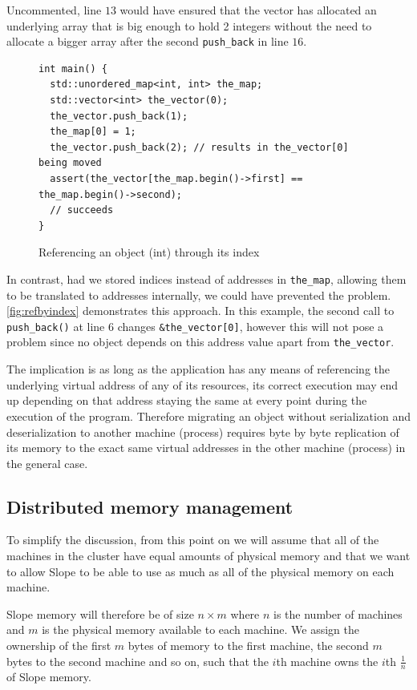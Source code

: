 Uncommented, line $13$ would have ensured that the vector has
    allocated an underlying array that is big enough to hold 2 integers without
    the need to allocate a bigger array after the second \texttt{push\_back} in
    line $16$.






\begin{figure}[tp]
\begin{lstlisting}
int main() {
  std::unordered_map<int, int> the_map;
  std::vector<int> the_vector(0);
  the_vector.push_back(1);
  the_map[0] = 1;
  the_vector.push_back(2); // results in the_vector[0] being moved
  assert(the_vector[the_map.begin()->first] == the_map.begin()->second);
  // succeeds
}
\end{lstlisting}
\caption{
    Referencing an object (int) through its index
}
\label{fig:refbyindex}
\end{figure}


In contrast, had we stored indices instead of addresses in \texttt{the\_map},
allowing them to be translated to addresses internally, we could have prevented
the problem. \autoref{fig:refbyindex} demonstrates this approach. In this example,
the second call to \texttt{push\_back()} at line $6$ changes \texttt{\&the\_vector[0]},
however this will not pose a problem since no object depends on this address
value apart from \texttt{the\_vector}.

The implication is as long as the
application has any means of referencing the underlying virtual address of any
of its resources, its correct execution may end up depending on that address
staying the same at every point during the execution of the program. Therefore
migrating an object without serialization and deserialization to another
machine (process)
requires byte by byte replication of its memory to the exact same virtual
addresses in the other machine (process) in the general case.

\subsection{Distributed memory management}
\label{sec:globalmem}
To simplify the discussion, from this point on we will assume that all of the
machines in the cluster have equal amounts of physical memory and that we want
to allow Slope to be able to use as much as all of the physical memory on each
machine.

Slope memory will therefore be of size $n \times m$ where $n$ is the number
of machines and $m$ is the physical memory available to each machine. We assign
the ownership of the first $m$ bytes of memory to the first machine, the
second $m$ bytes to the second machine and so on, such that the $i$th machine
owns the $i$th $\frac{1}{n}$ of Slope memory.

